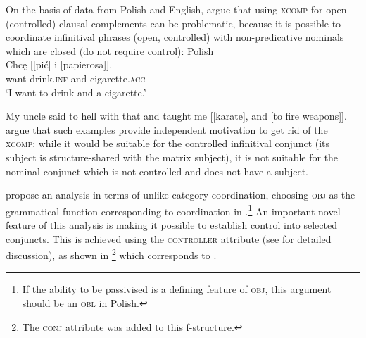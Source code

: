 \documentclass[output=paper]{../langscibook}
\begin{document}
On the basis of data from Polish and English,
\citet{PatejukPrzepiorkowski2014} argue that using
\textsc{xcomp} for open (controlled) clausal
complements can be problematic, because it is possible to coordinate
infinitival phrases (open, controlled) with non-predicative nominals
which are closed (do not require control):
\ea\label{ex:102:FROM:kall:93}Polish\\\gll
Chcę [[pić] i [papierosa]]. \\
want \phtm{[[}drink.\textsc{inf} and \phtm{[}cigarette.\textsc{acc}\\
\glt`I want to drink and a cigarette.' \hfill\citep[(1)]{PatejukPrzepiorkowski2014}
  \item\label{ex:27:FROM:PatejukPrzepiorkowski2014} My uncle said to hell with that and taught me [[karate], and [to
    fire weapons]]. \hspace*{\fill} \citep[(27)]{PatejukPrzepiorkowski2014}
\z
\citet{PatejukPrzepiorkowski2014} argue that such examples provide independent motivation
to get rid of the \textsc{xcomp}: while it would be suitable for the
controlled infinitival conjunct (its subject is structure-shared with
the matrix subject), it is not suitable for the nominal conjunct which
is not controlled and does not have a subject.

\largerpage[2]
\citet{PatejukPrzepiorkowski2014} propose an analysis in terms of unlike
category coordination, choosing \textsc{obj} as the grammatical
function corresponding to coordination in .\footnote{\label{fn:obj}If the
  ability to be passivised is a defining feature of \textsc{obj}, this
  argument should be an \textsc{obl} in Polish.} An important novel
feature of this analysis is making it possible to establish control
into selected conjuncts. This is achieved using the \textsc{controller} attribute (see
 for detailed discussion), as shown in
\footnote{The
  \textsc{conj} attribute was added to this f-structure.} which corresponds to .
 \hspace*{\fill} \citep[(26)]{PatejukPrzepiorkowski2014}\clearpage
\end{document}

